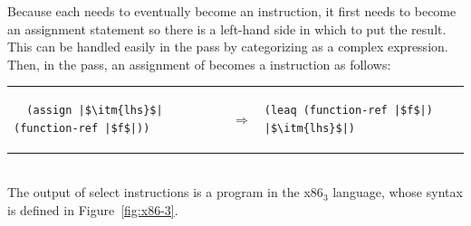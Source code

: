 \documentclass[11pt]{book}
\begin{document}
Because each  needs to eventually become an
 instruction, it first needs to become an assignment
statement so there is a left-hand side in which to put the
result. This can be handled easily in the  pass by
categorizing  as a complex expression.  Then, in
the  pass, an assignment of
 becomes a  instruction as follows: \\
\begin{tabular}{lll}
\begin{minipage}{0.45\textwidth}
\begin{lstlisting}
  (assign |$\itm{lhs}$| (function-ref |$f$|))
\end{lstlisting}
\end{minipage}
&
$\Rightarrow$
&
\begin{minipage}{0.4\textwidth}
\begin{lstlisting}
(leaq (function-ref |$f$|) |$\itm{lhs}$|)
\end{lstlisting}
\end{minipage}
\end{tabular} \\
%
The output of select instructions is a program in the x86$_3$
language, whose syntax is defined in Figure~\ref{fig:x86-3}.
\end{document}
